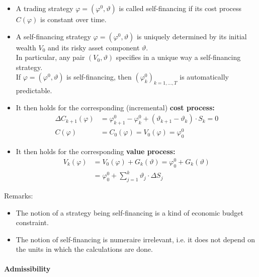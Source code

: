 \documentclass[a4paper,landscape,8pt,fleqn]{scrartcl}
\renewcommand{\emph}[1]{\textbf{#1}}
\begin{document}
\begin{multicols*}{3}
\begin{itemize}
\item A trading strategy $\varphi = (\varphi^0, \vartheta)$ is called self-financing if its cost process $C(\varphi)$ is constant over time.
\item A self-financing strategy $\varphi = (\varphi^0, \vartheta)$ is uniquely determined by its initial wealth $V_0$ and its risky asset component $\vartheta$. \\
In particular, any pair $(V_0, \vartheta)$ specifies in a unique way a self-financing strategy. \\
If $\varphi = (\varphi^0, \vartheta)$ is self-financing, then $(\varphi_k^0)_{k=1,\ldots, T}$ is automatically predictable.
\item It then holds for the corresponding (incremental) \emph{cost process:}
\begin{align*}
\Delta C_{k+1}(\varphi) &= \varphi_{k+1}^0 - \varphi_k^0 + (\vartheta_{k+1} - \vartheta_k) \cdot S_k = 0 \\
C(\varphi) &= C_0(\varphi) = V_0(\varphi) = \varphi_0^0
\end{align*}
\item It then holds for the corresponding \emph{value process:}
\begin{align*}
V_k(\varphi) &= V_0(\varphi) + G_k(\vartheta) = \varphi_0^0 + G_k(\vartheta) \\
&= \varphi_0^0 + \sum_{j=1}^k \vartheta_j \cdot \Delta S_j
\end{align*}
\end{itemize}
Remarks:
\begin{itemize}
\item The notion of a strategy being self-financing is a kind of economic budget constraint.
\item The notion of self-financing is numeraire irrelevant, i.e. it does not depend on the units in which the calculations are done.
\end{itemize}

\paragraph{Admissibility}


\end{multicols*}
\end{document}
